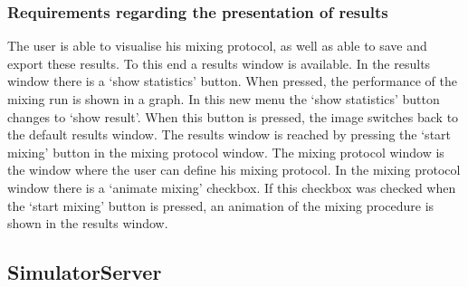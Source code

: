 \subsubsection{Requirements regarding the presentation of results}
The user is able to visualise his mixing protocol, as well as able to save and export these results. To this end a results window is available. In the results window there is a `show statistics' button. When pressed, the performance of the mixing run is shown in a graph. In this new menu the `show statistics' button changes to `show result'. When this button is pressed, the image switches back to the default results window. The results window is reached by pressing the `start mixing' button in the mixing protocol window. The mixing protocol window is the window where the user can define his mixing protocol. In the mixing protocol window there is a `animate mixing' checkbox. If this checkbox was checked when the `start mixing' button is pressed, an animation of the mixing procedure is shown in the results window.





\subsection{SimulatorServer}

